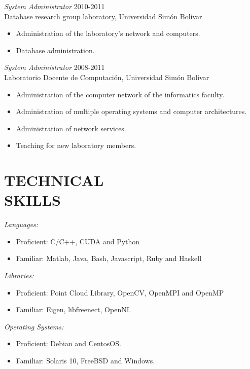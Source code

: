 \documentclass[margin, 10pt]{res} %
\begin{document}
\begin{resume}
{\sl System Administrator} \hfill 2010-2011 \\
Database research group laboratory, Universidad Sim\'on Bol\'ivar
\begin{itemize} 
\item Administration of the laboratory's network and computers.
\item Database administration.
\end{itemize} 

{\sl System Administrator} \hfill 2008-2011 \\
Laboratorio Docente de Computaci\'on, Universidad Sim\'on Bol\'ivar
\begin{itemize} 
\item Administration of the computer network of the informatics faculty.
\item Administration of multiple operating systems and computer architectures.
\item Administration of network services.
\item Teaching for new laboratory members.
\end{itemize} 



\section{TECHNICAL \\ SKILLS} 

{\sl Languages:} \\
\begin{itemize} 
\item Proficient: C/C++, CUDA and Python
\item Familiar: Matlab, Java, Bash, Javascript, Ruby and Haskell
\end{itemize} 

{\sl Libraries:} \\
\begin{itemize} 
\item Proficient: Point Cloud Library, OpenCV, OpenMPI and OpenMP
\item Familiar: Eigen, libfreenect, OpenNI.
\end{itemize} 

{\sl Operating Systems:} \\
\begin{itemize} 
\item Proficient: Debian and CentosOS.
\item Familiar: Solaris 10, FreeBSD and Windows.
\end{itemize} 
 

\end{resume}
\end{document}
